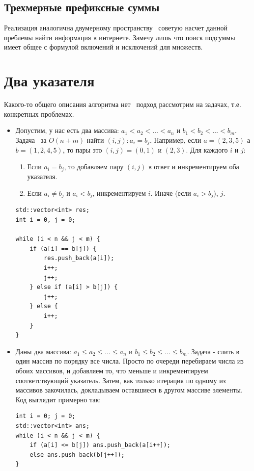 \documentclass[a4paper,12pt]{article}
\begin{document}
\subsection{Трехмерные префиксные суммы}
Реализация аналогична двумерному пространству \textendash\ советую насчет
данной преблемы найти информация в интернете. Замечу лишь что поиск подсуммы
имеет общее с формулой включений и исключений для множеств.

\section{Два указателя}
Какого-то общего описания алгоритма нет \textendash\ подход рассмотрим
на задачах, т.е. конкретных проблемах.
\begin{itemize}
	\item Допустим, у нас есть два массива:
	      $a_1 < a_2 < \dots < a_n$ и
	      $b_1 < b_2 < \dots < b_m$.
	      Задача \textendash\ за $O(n + m)$ найти $(i, j) : a_i = b_j$.
	      Например, если $a = (2, 3, 5)$ а $b = (1, 2, 4, 5)$, то пары это
	      $(i,j) = (0, 1)$ и $(2, 3)$.
	      Для каждого $i$ и $j$:
	      \begin{enumerate}
		      \item Если $a_i = b_j$, то добавляем пару $(i, j)$ в ответ и
		            инкрементируем оба указателя.
		      \item Если $a_i \neq b_j$ и $a_i < b_j$, инкрементируем $i$.
		            Иначе (если $a_i > b_j$), $j$.
	      \end{enumerate}
	      \begin{verbatim}
std::vector<int> res;
int i = 0, j = 0;

while (i < n && j < m) {
    if (a[i] == b[j]) {
        res.push_back(a[i]);
        i++;
        j++;
    } else if (a[i] > b[j]) {
        j++;
    } else {
        i++;
    }
}
       	  \end{verbatim}

	\item Даны два массива: $a_1 \leq a_2 \leq \dots \leq a_n $ и
	      $b_1 \leq b_2 \leq \dots \leq b_m$. Задача - слить в один массив
	      по порядку все числа.
	      Просто по очереди перебираем числа из обоих массивов, и добавляем
	      то, что меньше и инкрементируем соответствующий указатель. Затем,
	      как только итерация по одному из массивов закочилась, докладываем
	      оставшиеся в другом массиве элементы. Код выглядит примерно так:
	      \begin{verbatim}
int i = 0; j = 0;
std::vector<int> ans;
while (i < n && j < m) {
    if (a[i] <= b[j]) ans.push_back(a[i++]);
    else ans.push_back(b[j++]);
}


\end{verbatim}
\end{itemize}
\end{document}
